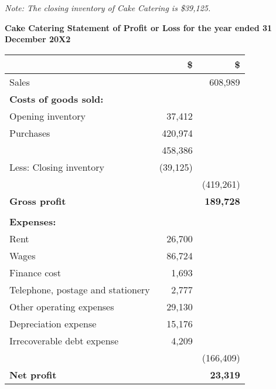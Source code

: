 \textit{Note: The closing inventory of Cake Catering is \$39,125.}

\textbf{Cake Catering Statement of Profit or Loss for the year ended 31 December 20X2}

\begin{tabular}{lrr}
\toprule
 & \textbf{\$} & \textbf{\$} \\
\midrule
Sales & & 608,989 \\
\textbf{Costs of goods sold:} & & \\
Opening inventory & 37,412 & \\
Purchases & 420,974 & \\
 & 458,386 & \\
Less: Closing inventory & (39,125) & \\
 & & (419,261) \\
\textbf{Gross profit} & & \textbf{189,728} \\
 & & \\
\textbf{Expenses:} & & \\
Rent & 26,700 & \\
Wages & 86,724 & \\
Finance cost & 1,693 & \\
Telephone, postage and stationery & 2,777 & \\
Other operating expenses & 29,130 & \\
Depreciation expense & 15,176 & \\
Irrecoverable debt expense & 4,209 & \\
 & & (166,409) \\
\textbf{Net profit} & & \textbf{23,319} \\
\bottomrule
\end{tabular}
